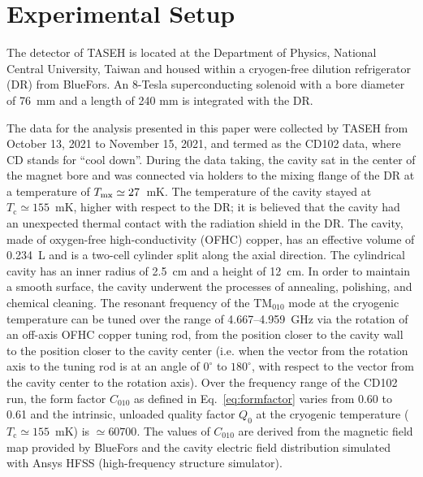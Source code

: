 
\section{Experimental Setup}\label{sec:taseh} 
The detector of TASEH is located at the Department of Physics, National 
Central University, Taiwan and housed within a cryogen-free dilution 
refrigerator (DR) from BlueFors. An 8-Tesla superconducting solenoid 
with a 
bore diameter of 76~mm and a length of 240 mm is integrated with the DR. 

The data for the analysis presented in this paper were collected by TASEH 
from October 13, 2021 to November 15, 2021, and termed as the CD102 data, 
where CD stands for ``cool down''. 
During the data taking, the cavity sat in the center of the magnet bore 
and was connected via holders to the mixing flange of the DR at a 
temperature of $T_{\rm mx}\simeq27$~mK. 
The temperature of the cavity stayed at $T_\text{c}\simeq155$~mK, higher 
with respect to the 
DR; it is believed that the cavity had an unexpected thermal contact with the 
radiation shield in the DR. 
The cavity, made of oxygen-free high-conductivity (OFHC) copper, has an 
effective volume of 0.234~L and is a two-cell cylinder split along 
the axial direction. 
The cylindrical cavity has an inner radius of 2.5~cm and a 
height of 12~cm.  In order to maintain a smooth surface, the cavity underwent 
the processes of annealing, polishing, and chemical cleaning. The resonant 
frequency of the TM$_{010}$ mode at the cryogenic temperature 
can be tuned over the range of 
4.667--4.959~GHz via the rotation of an off-axis OFHC copper tuning rod, from 
the position closer to the cavity wall to the position closer to the cavity 
center (i.e. when the vector from the rotation axis to the tuning rod is 
at an angle of $0^\circ$ to $180^\circ$, with respect to the vector from the 
cavity center to the rotation axis). 
%
Over the frequency range of the CD102 run, the form factor $C_{010}$ as 
defined in Eq.~\eqref{eq:formfactor} varies from 0.60 to 0.61 and 
the intrinsic, unloaded quality factor $Q_0$ at the cryogenic temperature 
($T_\mathrm{c}\simeq 155$~mK) is $\simeq 60700$. 
The values of $C_{010}$ are derived from the magnetic field map provided by 
BlueFors and the cavity electric field distribution simulated with 
 Ansys HFSS (high-frequency structure simulator).  

